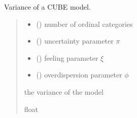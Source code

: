 \documentclass[letterpaper,10pt,english]{sphinxmanual}
\begin{document}
\begin{fulllineitems}
\label{\detokenize{cubmods:cubmods.cube.var}}
\pysigstartsignatures
{}
\pysigstopsignatures
\sphinxAtStartPar
Variance of a CUBE model.
\begin{quote}\begin{description}
\begin{itemize}
\item {} 
\sphinxAtStartPar
{} () \textendash{} number of ordinal categories

\item {} 
\sphinxAtStartPar
{} () \textendash{} uncertainty parameter \(\pi\)

\item {} 
\sphinxAtStartPar
{} () \textendash{} feeling parameter \(\xi\)

\item {} 
\sphinxAtStartPar
{} () \textendash{} overdispersion parameter \(\phi\)

\end{itemize}

\sphinxAtStartPar
the variance of the model

\sphinxAtStartPar
float

\end{description}\end{quote}

\end{fulllineitems}

\end{document}
